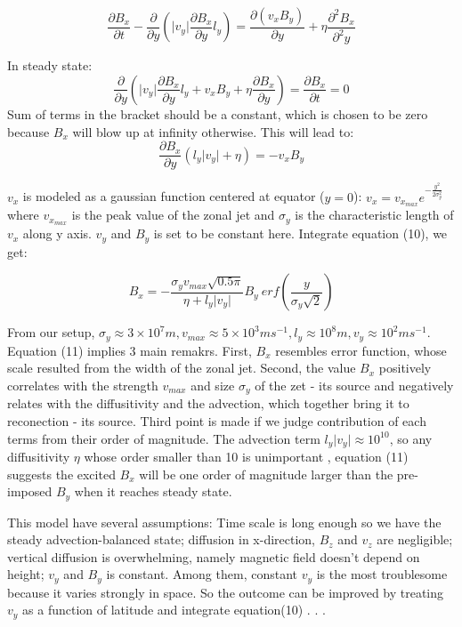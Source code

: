 \documentclass[11pt]{article}
\begin{document}
\begin{equation}
\frac{\partial B_x}{\partial t} -  \frac{\partial}{\partial y} (\vert v_y \vert \frac{\partial B_x}{\partial y} l_y )
  = \frac{\partial(v_x B_y)}{\partial y}+ \eta{\frac{\partial^2 B_x}{\partial^2 y}}
\end{equation}

In steady state:
\begin{equation}
\frac{\partial}{\partial y} (\vert v_y \vert \frac{\partial B_x}{\partial y} l_y  + v_x B_y+ \eta{\frac{\partial B_x}{\partial y}}) = \frac{\partial B_x}{\partial t} = 0
\end{equation}
Sum of terms in the bracket should be a constant, which is chosen to be zero because $B_x$ will blow up at infinity otherwise. This will lead to:
\begin{equation}
\frac{\partial B_x}{\partial y}(l_y \vert v_y \vert  + \eta) = - v_x B_y 
\end{equation}

$v_x$ is modeled as a gaussian function centered at equator ($y=0$): $ v_x = v_{x_{max}} e^{-\frac{y^2}{2\sigma_y^2} }  $ where $v_{x_{max}}$ is the peak value of the zonal jet and $\sigma_y $ is the characteristic length of $v_x$ along y axis. 
 $v_y$ and $B_y$ is set to be constant here. Integrate equation (10), we get:
 
\begin{equation}
B_x = -\frac{\sigma_y v_{max} \sqrt{0.5\pi}}{\eta + l_y \vert v_y \vert} B_y \ erf(\frac{y}{\sigma_y\sqrt{2}})
\end{equation}


From our setup, $ \sigma_y \approx 3 \times 10^7 m, v_{max} \approx 5 \times 10^3 ms^{-1}, l_y \approx 10^8 m, v_y \approx 10^2 ms^{-1}$. Equation (11) implies 3 main remakrs. First, $ B_x$  resembles error function, whose scale resulted from the width of the zonal jet. Second, the value $B_x$ positively correlates with the strength $v_{max}$ and size $\sigma_y$ of the zet - its source and negatively relates with the diffusitivity and the advection, which together bring it to reconection - its source. Third point is made if we judge contribution of each terms from their order of magnitude. The advection term $l_y \vert v_y \vert \approx 10^{10}$, so any diffusitivity $\eta$ whose order smaller than 10 is unimportant 
, equation (11) suggests the excited $B_x$ will be one order of magnitude larger than the pre-imposed $B_y$ when it reaches steady state.

This model have several assumptions: Time scale is long enough so we have the steady advection-balanced state; diffusion in x-direction, $B_z$ and $v_z$ are negligible; vertical diffusion is overwhelming, namely magnetic field doesn't depend on height; $v_y$ and $B_y$ is constant. Among them, constant $v_y$ is the most troublesome because it varies strongly in space. So the outcome can be improved by treating $v_y$ as a function of latitude and integrate equation(10)
.
.
.
\end{document}
